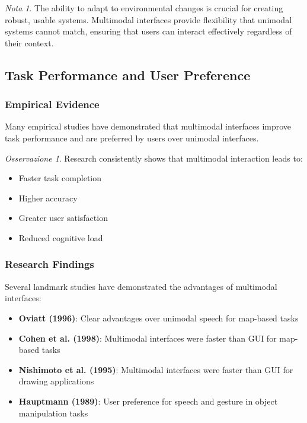 \documentclass[11pt,a4paper]{article}
\theoremstyle{definition}
\theoremstyle{plain}
\theoremstyle{remark}
\newtheorem*{remark}{Nota}
\newtheorem*{observation}{Osservazione}
\begin{document}
\begin{remark}
The ability to adapt to environmental changes is crucial for creating robust, usable systems. Multimodal interfaces provide flexibility that unimodal systems cannot match, ensuring that users can interact effectively regardless of their context.
\end{remark}

\subsection{Task Performance and User Preference}

\subsubsection{Empirical Evidence}

Many empirical studies have demonstrated that multimodal interfaces improve task performance and are preferred by users over unimodal interfaces.

\begin{observation}
Research consistently shows that multimodal interaction leads to:
\begin{itemize}
    \item Faster task completion
    \item Higher accuracy
    \item Greater user satisfaction
    \item Reduced cognitive load
\end{itemize}
\end{observation}

\subsubsection{Research Findings}

Several landmark studies have demonstrated the advantages of multimodal interfaces:

\begin{itemize}
    \item \textbf{Oviatt (1996)}: Clear advantages over unimodal speech for map-based tasks
    
    \item \textbf{Cohen et al. (1998)}: Multimodal interfaces were faster than GUI for map-based tasks
    
    \item \textbf{Nishimoto et al. (1995)}: Multimodal interfaces were faster than GUI for drawing applications
    
    \item \textbf{Hauptmann (1989)}: User preference for speech and gesture in object manipulation tasks
\end{itemize}
\end{document}
